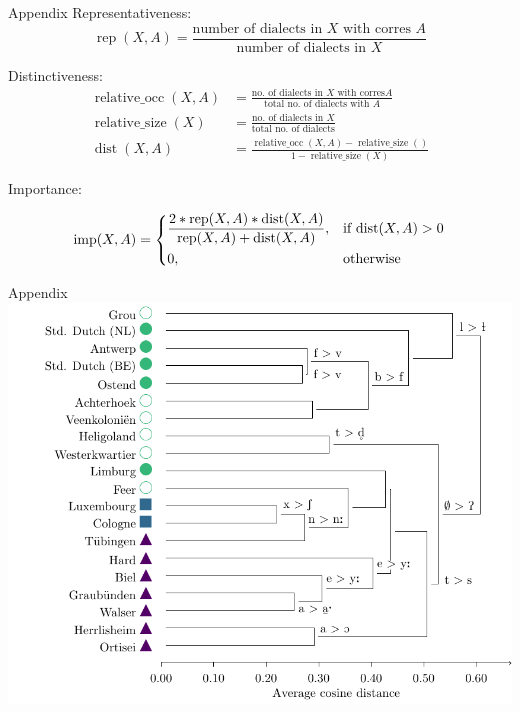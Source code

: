 \documentclass[xcolor={dvipsnames}]{beamer}
\begin{document}
\begin{frame}{Appendix}
Representativeness:
\begin{equation*}
\operatorname{rep}(X, A) = 
\frac{\text{number of dialects in } X \text{ with corres }  A}
{\text{number of dialects in }  X}
\end{equation*}

Distinctiveness:
\begin{align*}
\operatorname{relative\_occ}(X, A) &= 
\frac{\text{no. of dialects in } X \text{ with corres} A}
{\text{total no. of dialects with } A}\\
\operatorname{relative\_size}(X) &= 
\frac{\text{no. of dialects in } X}
{\text{total no. of dialects}}\\
\operatorname{dist}(X, A) &= 
\frac{\operatorname{relative\_occ}(X, A) - \operatorname{relative\_size}()}
{1 - \operatorname{relative\_size}(X)}
\end{align*}

Importance:
\begin{adjustwidth}{-3cm}{-3cm}
\begin{equation*}
\operatorname{imp}(X, A) = 
\begin{dcases}
\frac{
2 * \operatorname{rep}(X, A) * \operatorname{dist}(X, A)}
{\operatorname{rep}(X, A) + \operatorname{dist}(X, A)}, & \text{if dist}(X, A) > 0\\
0, & \text{otherwise}
\end{dcases}
\end{equation*}
\end{adjustwidth}
\end{frame}

\begin{frame}{Appendix}
\includegraphics[width=\textwidth]{figures/tfidf-nocontext.pdf}
\end{frame}
\end{document}
